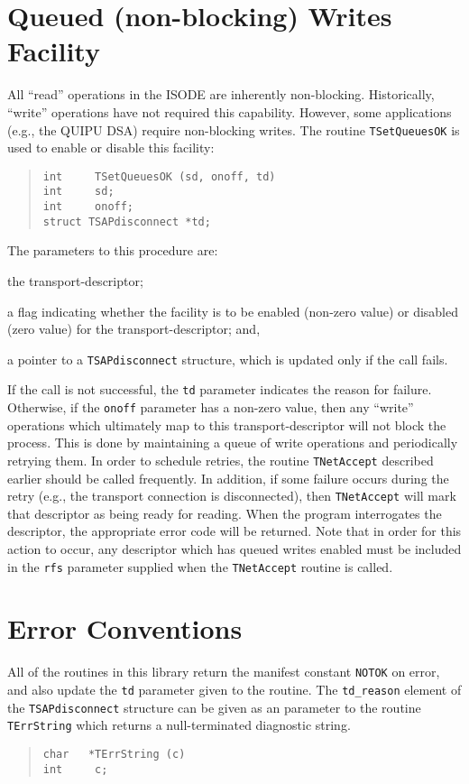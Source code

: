 \section	{Queued (non-blocking) Writes Facility}
All ``read'' operations in the ISODE are inherently non-blocking.
Historically, ``write'' operations have not required this capability.
However,
some applications (e.g., the QUIPU DSA) require non-blocking writes.
The routine \verb"TSetQueuesOK" is used to enable or disable this facility:
\begin{quote}\small\begin{verbatim}
int     TSetQueuesOK (sd, onoff, td)
int     sd;
int     onoff;
struct TSAPdisconnect *td;
\end{verbatim}\end{quote}
The parameters to this procedure are:
\begin{describe}
\item[\verb"sd":] the transport-descriptor;

\item[\verb"onoff":] a flag indicating whether the facility is to be enabled
(non-zero value) or disabled (zero value) for the transport-descriptor;
and,

\item[\verb"td":] a pointer to a \verb"TSAPdisconnect" structure,
which is updated only if the call fails.
\end{describe}
If the call is not successful,
the \verb"td" parameter indicates the reason for failure.
Otherwise,
if the \verb"onoff" parameter has a non-zero value,
then any ``write'' operations which ultimately map to this
transport-descriptor will not block the process.
This is done by maintaining a queue of write operations and periodically
retrying them.
In order to schedule retries,
the routine \verb"TNetAccept" described earlier should be called frequently.
In addition,
if some failure occurs during the retry
(e.g., the transport connection is disconnected),
then \verb"TNetAccept" will mark that descriptor as being ready for reading.
When the program interrogates the descriptor,
the appropriate error code will be returned.
Note that in order for this action to occur,
any descriptor which has queued writes enabled must be included in the
\verb"rfs" parameter supplied when the \verb"TNetAccept" routine is called.

\section	{Error Conventions}
All of the routines in this library return the manifest constant \verb"NOTOK"
on error,
and also update the \verb"td" parameter given to the routine.
The \verb"td_reason" element of the \verb"TSAPdisconnect" structure can be
given as an parameter to the routine \verb"TErrString" which returns a
null-terminated diagnostic string.
\begin{quote}\small\begin{verbatim}
char   *TErrString (c)
int     c;
\end{verbatim}\end{quote}

